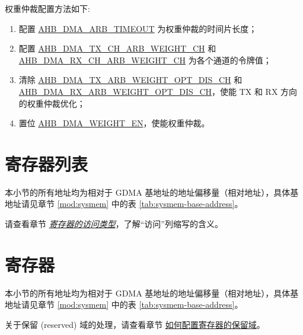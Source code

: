 \documentclass[main\_\_CN.tex]{subfiles}
\begin{document}
权重仲裁配置方法如下:
\begin{enumerate}
\item 配置 \hyperref[fielddesc:AHBDMAARBTIMEOUT]{AHB\_DMA\_ARB\_TIMEOUT} 为权重仲裁的时间片长度；
\item 配置 \hyperref[fielddesc:AHBDMATXCHARBWEIGHTCHN]{AHB\_DMA\_TX\_CH\_ARB\_WEIGHT\_CH} 和 \hyperref[fielddesc:AHBDMARXCHARBWEIGHTCHN]{AHB\_DMA\_RX\_CH\_ARB\_WEIGHT\_CH} 为各个通道的令牌值；
\item 清除 \hyperref[fielddesc:AHBDMATXARBWEIGHTOPTDISCHN]{AHB\_DMA\_TX\_ARB\_WEIGHT\_OPT\_DIS\_CH} 和\hyperref[fielddesc:AHBDMARXARBWEIGHTOPTDISCHN]{AHB\_DMA\_RX\_ARB\_WEIGHT\_OPT\_DIS\_CH}，使能 TX 和 RX 方向的权重仲裁优化；
\item 置位 \hyperref[fielddesc:AHBDMAWEIGHTEN]{AHB\_DMA\_WEIGHT\_EN}，使能权重仲裁。
\end{enumerate}





\newpage
\begin{landscape}
\hypertarget{dma-reg-summ}{}
\section{寄存器列表}
\label{sec:dma-reg-summ}

本小节的所有地址均为相对于 GDMA 基地址的地址偏移量（相对地址），具体基地址请见章节 \ref{mod:sysmem} \textit{} 中的表 \ref{tab:sysmem-base-address}。

请查看章节 \hyperref[glossary-access-types]{\textit{寄存器的访问类型}}，了解“访问”列缩写的含义。



\end{landscape}



\newpage
\section{寄存器}

本小节的所有地址均为相对于 GDMA 基地址的地址偏移量（相对地址），具体基地址请见章节 \ref{mod:sysmem} \textit{} 中的表 \ref{tab:sysmem-base-address}。

关于保留 (reserved) 域的处理，请查看章节 \hyperref[programming-reserved-field]{如何配置寄存器的保留域}。


\end{document}
